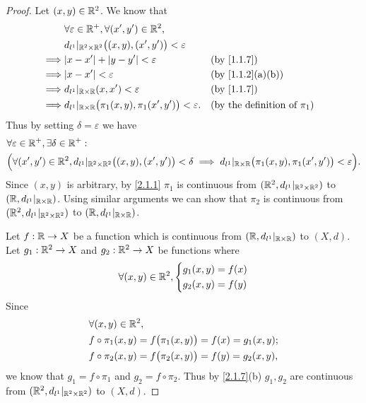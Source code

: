 \begin{proof}
  Let \((x, y) \in \mathbb{R}^2\).
  We know that
  \begin{align*}
             & \forall \varepsilon \in \R^+, \forall (x', y') \in \R^2,                                                                \\
             & d_{l^1}|_{\R^2 \times \R^2}\big((x, y), (x', y')\big) < \varepsilon                                                     \\
    \implies & \abs{x - x'} + \abs{y - y'} < \varepsilon                                  &  & \by{1.1.7}                              \\
    \implies & \abs{x - x'} < \varepsilon                                                 &  & \text{(by \cref{1.1.2}(a)(b))}          \\
    \implies & d_{l^1}|_{\R \times \R}(x, x') < \varepsilon                               &  & \by{1.1.7}                              \\
    \implies & d_{l^1}|_{\R \times \R}\big(\pi_1(x, y), \pi_1(x', y')\big) < \varepsilon. &  & \text{(by the definition of \(\pi_1\))}
  \end{align*}
  Thus by setting \(\delta = \varepsilon\) we have
  \begin{align*}
     & \forall \varepsilon \in \mathbb{R}^+, \exists \delta \in \mathbb{R}^+ :                                                                                                                                 \\
     & \Big(\forall (x', y') \in \mathbb{R}^2, d_{l^1}|_{\mathbb{R}^2 \times \mathbb{R}^2}\big((x, y), (x', y')\big) < \delta \implies d_{l^1}|_{\mathbb{R} \times \mathbb{R}}\big(\pi_1(x, y), \pi_1(x', y')\big) < \varepsilon\Big).
  \end{align*}
  Since \((x, y)\) is arbitrary, by \cref{2.1.1} \(\pi_1\) is continuous from \((\mathbb{R}^2, d_{l^1}|_{\mathbb{R}^2 \times \mathbb{R}^2})\) to \((\mathbb{R}, d_{l^1}|_{\mathbb{R} \times \mathbb{R}})\).
  Using similar arguments we can show that \(\pi_2\) is continuous from \((\mathbb{R}^2, d_{l^1}|_{\mathbb{R}^2 \times \mathbb{R}^2})\) to \((\mathbb{R}, d_{l^1}|_{\mathbb{R} \times \mathbb{R}})\).

  Let \(f : \mathbb{R} \to X\) be a function which is continuous from \((\mathbb{R}, d_{l^1}|_{\mathbb{R} \times \mathbb{R}})\) to \((X, d)\).
  Let \(g_1 : \mathbb{R}^2 \to X\) and \(g_2 : \mathbb{R}^2 \to X\) be functions where
  \[
    \forall (x, y) \in \mathbb{R}^2, \begin{dcases}
      g_1(x, y) = f(x) \\
      g_2(x, y) = f(y)
    \end{dcases}
  \]
  Since
  \begin{align*}
     & \forall (x, y) \in \mathbb{R}^2,                                         \\
     & f \circ \pi_1(x, y) = f\big(\pi_1(x, y)\big) = f(x) = g_1(x, y); \\
     & f \circ \pi_2(x, y) = f\big(\pi_2(x, y)\big) = f(y) = g_2(x, y),
  \end{align*}
  we know that \(g_1 = f \circ \pi_1\) and \(g_2 = f \circ \pi_2\).
  Thus by \cref{2.1.7}(b) \(g_1, g_2\) are continuous from \((\mathbb{R}^2, d_{l^1}|_{\mathbb{R}^2 \times \mathbb{R}^2})\) to \((X, d)\).
\end{proof}

